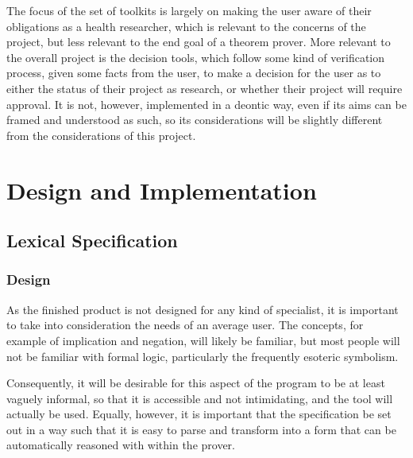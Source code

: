 \documentclass{l4proj}
\begin{document}
The focus of the set of toolkits is largely on making the user aware of their obligations as a health researcher, which is relevant to the concerns of the project, but less relevant to the end goal of a theorem prover. More relevant to the overall project is the decision tools, which follow some kind of verification process, given some facts from the user, to make a decision for the user as to either the status of their project as research, or whether their project will require approval. It is not, however, implemented in a deontic way, even if its aims can be framed and understood as such, so its considerations will be slightly different from the considerations of this project. 


\chapter{Design and Implementation}


\section{Lexical Specification}


\subsection{Design}
As the finished product is not designed for any kind of specialist, it is important to take into consideration the needs of an average user. The concepts, for example of implication and negation, will likely be familiar, but most people will not be familiar with formal logic, particularly the frequently esoteric symbolism. 

Consequently, it will be desirable for this aspect of the program to be at least vaguely informal, so that it is accessible and not intimidating, and the tool will actually be used. Equally, however, it is important that the specification be set out in a way such that it is easy to parse and transform into a form that can be automatically reasoned with within the prover. 
\end{document}
